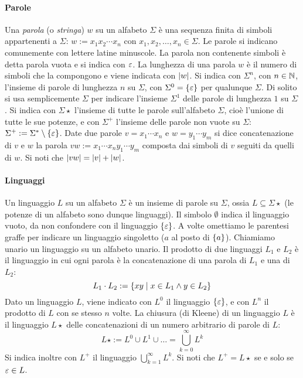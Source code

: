 \paragraph{Parole} Una \emph{parola} (o \emph{stringa}) $w$ su un alfabeto $\Sigma$ è una sequenza finita di simboli appartenenti a $\Sigma$: $w:=x_1 x_2 \cdots x_n$ con $x_1,x_2,\dots,x_n\in\Sigma$. Le parole si indicano comunemente con lettere latine minuscole. La parola non contenente simboli è detta parola vuota e si indica con $\varepsilon$. La lunghezza di una parola $w$ è il numero di simboli che la compongono e viene indicata con $|w|$. Si indica con $\Sigma^n$, con $n\in\mathbb N$, l'insieme di parole di lunghezza $n$ su $\Sigma$, con $\Sigma^0=\left\{ \varepsilon \right\}$ per qualunque $\Sigma$. Di solito si usa semplicemente $\Sigma$ per indicare l'insieme $\Sigma^1$ delle parole di lunghezza $1$ su $\Sigma$. Si indica con $\Sigma\star$ l'insieme di tutte le parole sull'alfabeto $\Sigma$, cioè l'unione di tutte le sue potenze, e con $\Sigma^+$ l'insieme delle parole non vuote su $\Sigma$: $\Sigma^+ := \Sigma^*\setminus\left\{ \varepsilon \right\}$. Date due parole $v=x_1\cdots x_n$ e $w=y_1\cdots y_m$ si dice concatenazione di $v$ e $w$ la parola $vw:=x_1\cdots x_n y_1\cdots y_m$ composta dai simboli di $v$ seguiti da quelli di $w$. Si noti che $|vw|=|v|+|w|$.

\paragraph{Linguaggi} Un linguaggio $L$ su un alfabeto $\Sigma$ è un insieme di parole su $\Sigma$, ossia $L\subseteq\Sigma\star$ (le potenze di un alfabeto sono dunque linguaggi). Il simbolo $\emptyset$ indica il linguaggio vuoto, da non confondere con il linguaggio $\left\{ \varepsilon \right\}$.  A volte omettiamo le parentesi graffe per indicare un linguaggio singoletto ($a$ al posto di $\left\{ a \right\}$). Chiamiamo unario un linguaggio su un alfabeto unario. Il prodotto di due linguaggi $L_1$ e $L_2$ è il linguaggio in cui ogni parola è la concatenazione di una parola di $L_1$ e una di $L_2$:
\begin{equation*}
	L_1\cdot L_2 := \left\{ xy\mid x\in L_1 \land y\in L_2 \right\}
\end{equation*}
Dato un linguaggio $L$, viene indicato con $L^0$ il linguaggio $\left\{ \varepsilon \right\}$, e con $L^n$ il prodotto di $L$ con se stesso $n$ volte. La chiusura (di Kleene) di un linguaggio $L$ è il linguaggio $L\star$ delle concatenazioni di un numero arbitrario di parole di $L$:
\begin{equation*}
	L\star := L^0\cup L^1\cup\dots=\bigcup_{k=0}^\infty L^k
\end{equation*}
Si indica inoltre con $L^+$ il linguaggio $\bigcup_{k=1}^\infty L^k$. Si noti che $L^+=L\star$ se e solo se $\varepsilon\in L$.


